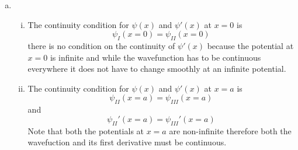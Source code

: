 \documentclass[11pt]{article}
\numberwithin{equation}{section}
\begin{document}
\begin{enumerate}[(a)]
\item
\begin{enumerate}[(i)]

\item
The continuity condition for $\psi(x)$ and $\psi'(x)$ at $x=0$ is
$$\psi_{I}(x=0) = \psi_{II}(x=0)$$
there is no condition on the continuity of $\psi'(x)$ because the potential at $x=0$ is infinite and while the wavefunction has to be continuous everywhere it does not have to change smoothly at an infinite potential.

\item
The continuity condition for $\psi(x)$ and $\psi'(x)$ at $x=a$ is
$$\psi_{II}(x=a) = \psi_{III}(x=a)$$
and
$$\psi_{II}'(x=a) = \psi_{III}'(x=a)$$
Note that both the potentials at $x=a$ are non-infinite therefore both the wavefuction and its first derivative must be continuous.
\end{enumerate}
\end{enumerate}
\end{document}

